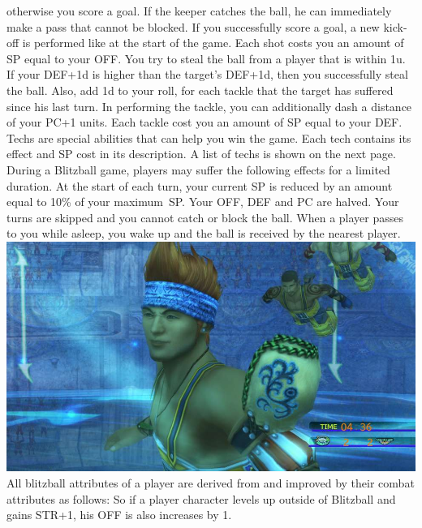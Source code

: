 otherwise you score a goal.
If the keeper catches the ball, he can immediately make a pass that cannot be blocked.
If you successfully score a goal, a new kick-off is performed like at the start of the game.
Each shot costs you an amount of SP equal to your OFF.
%	
\ofrow
%
 You try to steal the ball from a player that is within 1u.
If your DEF+1d is higher than the target's DEF+1d, then you successfully steal the ball.
Also, add 1d to your roll, for each tackle that the target has suffered since his last turn.
In performing the tackle, you can additionally dash a distance of your PC+1 units.
Each tackle cost you an amount of SP equal to your DEF.
%
\ofrow
%	
Techs are special abilities that can help you win the game.	
Each tech contains its effect and SP cost in its description.
A list of techs is shown on the next page.
%
\vfill
%
During a Blitzball game, players may suffer the following effects for a limited duration.\ofrow
{} At the start of each turn, your current SP is reduced by an amount equal to 10\% of your maximum~SP.\ofrow
{} Your OFF, DEF and PC are halved.\ofrow
{} Your turns are skipped and you cannot catch or block the ball.
When a player passes to you while asleep, you wake up and the ball is received by the nearest player.
%
\clearpage
%
\ofpar
%
\includegraphics[width=\columnwidth]{./art/blitz/ingame.jpg}
%
\ofpar
%
All blitzball attributes of a player are derived from and improved by their combat attributes as follows: \ofrow
{} \ofrow
{} \ofrow
{} \ofrow
{} \ofrow
%
So if a player character levels up outside of Blitzball and gains STR+1, his OFF is also increases by 1.
